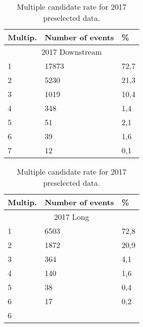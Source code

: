 \begin{table}[h!]
\begin{center}
\begin{tabular}{ p{2.6cm}p{3.1cm}p{0.6cm} }
\hline
\hline
Multip.  & Number of events & \% \\
\hline
    \multicolumn{3}{c}{2017 Downstream}\\
\hline

     1    & 17873	& 72,7 \\
     2    & 5230	& 21,3 \\
     3    & 1019	& 10,4 \\
     4    & 348	& 1,4 \\
     5    & 51	& 2,1 \\
     6    & 39	& 1,6 \\
     7    & 12	& 0,1 \\

\hline
\end{tabular}
\quad
\begin{tabular}{ p{2.6cm}p{3.1cm}p{0.6cm} }
\hline
\hline
Multip.  & Number of events & \% \\
\hline
    \multicolumn{3}{c}{2017 Long}\\
\hline

     1    & 6503	& 72,8 \\
     2    & 1872	& 20,9  \\
     3    & 364	& 4,1  \\
     4    & 140	& 1,6  \\
     5    & 38	& 0,4  \\
     6    & 17	& 0,2  \\
     6    & 	&   \\

\hline
\end{tabular}
\caption{Multiple candidate rate for 2017 preselected data.}
\label{tab:multi2017sel}
\end{center}
\end{table}%

